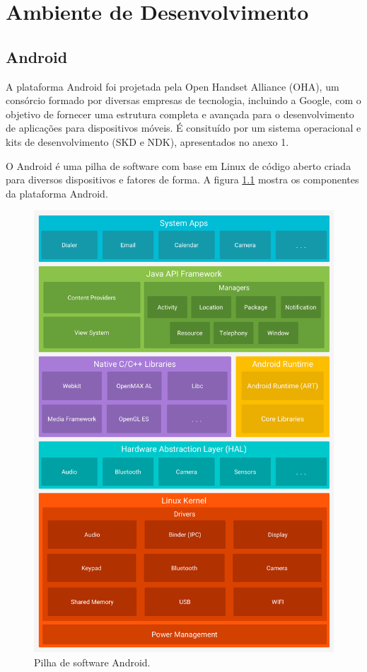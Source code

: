 \chapter{Ambiente de Desenvolvimento}\label{cap:ambdes}

\section{Android}\label{sec:android}
A plataforma Android foi projetada pela Open Handset Alliance (OHA), um consórcio formado por diversas empresas de tecnologia, incluindo a Google, com o objetivo de fornecer uma estrutura completa e avançada para o desenvolvimento de aplicações para dispositivos móveis. É consituído por um sistema operacional e kits de desenvolvimento (SKD e NDK), apresentados no anexo 1.

O Android é uma pilha de software com base em Linux de código aberto criada para diversos dispositivos e fatores de forma. A figura \ref{fig:android_stack} mostra os componentes da plataforma Android. \cite{arquiteturaplataforma}

	\begin{figure}[!htb]
       \begin{center}  
          \includegraphics[width=0.5\columnwidth]{img/android_stack.jpg}
           \caption{\label{fig:android_stack}Pilha de software Android.}
       \end{center}
   \end{figure}



